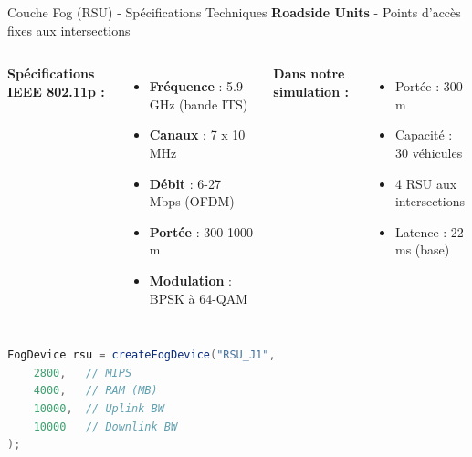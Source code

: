 ﻿\documentclass[aspectratio=169,11pt]{beamer}
\begin{document}
\begin{frame}[fragile]{Couche Fog (RSU) - Sp\'ecifications Techniques}
\textbf{Roadside Units} - Points d'acc\`es fixes aux intersections

\begin{columns}
\textbf{Sp\'ecifications IEEE 802.11p :}
\begin{itemize}
    \item \textbf{Fr\'equence} : 5.9 GHz (bande ITS)
    \item \textbf{Canaux} : 7 x 10 MHz
    \item \textbf{D\'ebit} : 6-27 Mbps (OFDM)
    \item \textbf{Port\'ee} : 300-1000 m
    \item \textbf{Modulation} : BPSK \`a 64-QAM
\end{itemize}

\textbf{Dans notre simulation :}
\begin{itemize}
    \item Port\'ee : 300 m
    \item Capacit\'e : 30 v\'ehicules
    \item 4 RSU aux intersections
    \item Latence : 22 ms (base)
\end{itemize}
\end{columns}

\vspace{0.3cm}
\begin{lstlisting}[language=Java]
FogDevice rsu = createFogDevice("RSU_J1",
    2800,   // MIPS
    4000,   // RAM (MB)
    10000,  // Uplink BW
    10000   // Downlink BW
);
\end{lstlisting}
\end{frame}
\end{document}

